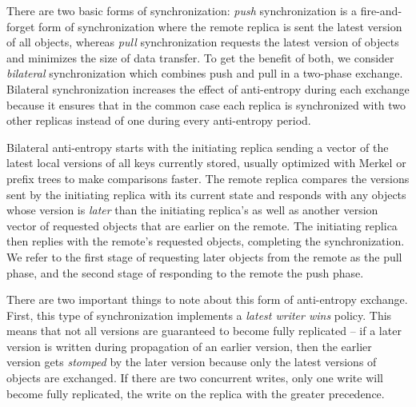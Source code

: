 There are two basic forms of synchronization: \textit{push} synchronization
is a fire-and-forget form of synchronization where the remote replica is sent
the latest version of all objects, whereas \textit{pull} synchronization
requests the latest version of objects and minimizes the size of data
transfer.
To get the benefit of both, we consider \textit{bilateral} synchronization
which combines push and pull in a two-phase exchange.
Bilateral synchronization increases the effect of anti-entropy during each
exchange because it ensures that in the common case each replica is
synchronized with two other replicas instead of one during every anti-entropy
period.

Bilateral anti-entropy starts with the initiating replica sending a vector of
the latest local versions of all keys currently stored, usually optimized
with Merkel or prefix trees to make comparisons faster.
The remote replica compares the versions sent by the initiating replica with
its current state and responds with any objects whose version is
\textit{later} than the initiating replica's as well as another version
vector of requested objects that are earlier on the remote.
The initiating replica then replies with the remote's requested objects,
completing the synchronization.
We refer to the first stage of requesting later objects from the remote as
the pull phase, and the second stage of responding to the remote the push
phase.

There are two important things to note about this form of anti-entropy
exchange.
First, this type of synchronization implements a \textit{latest writer wins}
policy.
This means that not all versions are guaranteed to become fully replicated
-- if a later version is written during propagation of an earlier version,
then the earlier version gets \emph{stomped} by the later version because
only the latest versions of objects are exchanged.
If there are two concurrent writes, only one write will become fully
replicated, the write on the replica with the greater precedence.



